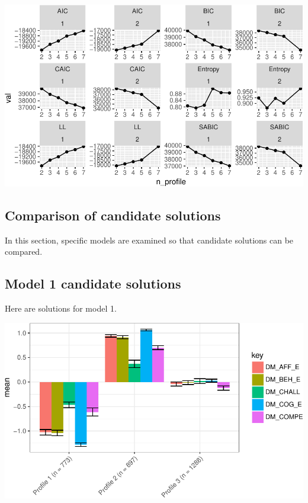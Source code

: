 \documentclass[]{book}
\theoremstyle{definition}
\theoremstyle{definition}
\theoremstyle{definition}
\theoremstyle{remark}
\begin{document}
\begin{center}\includegraphics[width=1\linewidth]{rosenberg-dissertation_files/figure-latex/model1-1} \end{center}

\subsection{Comparison of candidate
solutions}\label{comparison-of-candidate-solutions}

In this section, specific models are examined so that candidate
solutions can be compared.

\subsection{Model 1 candidate
solutions}\label{model-1-candidate-solutions}

Here are solutions for model 1.

\begin{center}\includegraphics[width=0.8\linewidth]{rosenberg-dissertation_files/figure-latex/spec-solutions-m1_3-1} \end{center}
\end{document}
